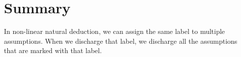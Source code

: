 \documentclass[../../../main.tex]{subfiles}
\begin{document}
 
\section{Summary}

In non-linear natural deduction, we can assign the same label to multiple assumptions. When we discharge that label, we discharge all the assumptions that are marked with that label. 

\begin{comment}We can also discharge no labels, which we call a vacuous discharge.\end{comment}
\end{document}
